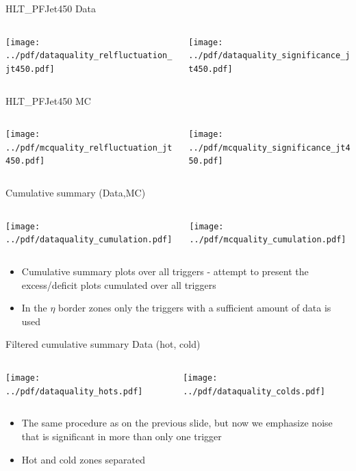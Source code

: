 \documentclass[9pt]{beamer}
\begin{document}
\begin{frame}[t]{HLT\_PFJet450 Data}
\begin{columns}[T]
  \begin{column}{.5\textwidth}
  \texttt{[image: ../pdf/dataquality\_relfluctuation\_jt450.pdf]}
  \end{column}
  \begin{column}{.5\textwidth}
  \texttt{[image: ../pdf/dataquality\_significance\_jt450.pdf]}
  \end{column}
\end{columns}
\end{frame}

\begin{frame}[t]{HLT\_PFJet450 MC}
\begin{columns}[T]
  \begin{column}{.5\textwidth}
  \texttt{[image: ../pdf/mcquality\_relfluctuation\_jt450.pdf]}
  \end{column}
  \begin{column}{.5\textwidth}
  \texttt{[image: ../pdf/mcquality\_significance\_jt450.pdf]}
  \end{column}
\end{columns}
\end{frame}

\begin{frame}[t]{Cumulative summary (Data,MC)}
\begin{columns}[T]
  \begin{column}{.5\textwidth}
  \texttt{[image: ../pdf/dataquality\_cumulation.pdf]}
  \end{column}
  \begin{column}{.5\textwidth}
  \texttt{[image: ../pdf/mcquality\_cumulation.pdf]}
  \end{column}
\end{columns}
\begin{itemize}
 \item Cumulative summary plots over all triggers - attempt to present the excess/deficit plots cumulated over all triggers
 \item In the $\eta$ border zones only the triggers with a sufficient amount of data is used
\end{itemize}
\end{frame}

\begin{frame}[t]{Filtered cumulative summary Data (hot, cold)}
\begin{columns}[T]
  \begin{column}{.5\textwidth}
  \texttt{[image: ../pdf/dataquality\_hots.pdf]}
  \end{column}
  \begin{column}{.5\textwidth}
  \texttt{[image: ../pdf/dataquality\_colds.pdf]}
  \end{column}
\end{columns}
\begin{itemize}
 \item The same procedure as on the previous slide, but now we emphasize noise that is significant in more than only one trigger
 \item Hot and cold zones separated
\end{itemize}
\end{frame}
\end{document}
